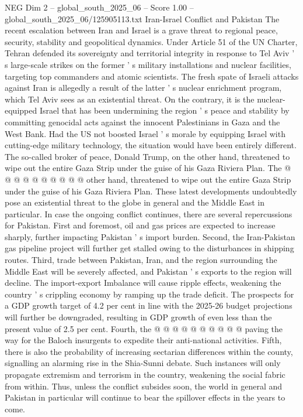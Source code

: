 \begin{textsample}{NEG Dim 2 – global\_south\_2025\_06 – Score 1.00 – global\_south\_2025\_06/125905113.txt}  \label{ex:f2_neg_367}
Iran-Israel Conflict and Pakistan The recent escalation between Iran and Israel is a grave threat to regional peace, security, stability and geopolitical dynamics.
Under Article 51 of the UN Charter, Tehran defended its sovereignty and territorial integrity in response to Tel Aviv ' s large-scale strikes on the former ' s military installations and nuclear facilities, targeting top commanders and atomic scientists.
The fresh spate of Israeli attacks against Iran is allegedly a result of the latter ' s nuclear enrichment program, which Tel Aviv sees as an existential threat.
On the contrary, it is the nuclear-equipped Israel that has been undermining the region ' s peace and stability by committing genocidal acts against the innocent Palestinians in Gaza and the West Bank.
Had the US not boosted Israel ' s morale by equipping Israel with cutting-edge military technology, the situation would have been entirely different.
The so-called broker of peace, Donald Trump, on the other hand, threatened to wipe out the entire Gaza Strip under the guise of his Gaza Riviera Plan.
The @ @ @ @ @ @ @ @ @ @ other hand, threatened to wipe out the entire Gaza Strip under the guise of his Gaza Riviera Plan.
These latest developments undoubtedly pose an existential threat to the globe in general and the Middle East in particular.
In case the ongoing conflict continues, there are several repercussions for Pakistan.
First and foremost, oil and gas prices are expected to increase sharply, further impacting Pakistan ' s import burden.
Second, the Iran-Pakistan gas pipeline project will further get stalled owing to the disturbances in shipping routes.
Third, trade between Pakistan, Iran, and the region surrounding the Middle East will be severely affected, and Pakistan ' s exports to the region will decline.
The import-export Imbalance will cause ripple effects, weakening the country ' s crippling economy by ramping up the trade deficit.
The prospects for a GDP growth target of 4.2 per cent in line with the 2025-26 budget projections will further be downgraded, resulting in GDP growth of even less than the present value of 2.5 per cent.
Fourth, the @ @ @ @ @ @ @ @ @ @ paving the way for the Baloch insurgents to expedite their anti-national activities.
Fifth, there is also the probability of increasing sectarian differences within the county, signalling an alarming rise in the Shia-Sunni debate.
Such instances will only propagate extremism and terrorism in the country, weakening the social fabric from within.
Thus, unless the conflict subsides soon, the world in general and Pakistan in particular will continue to bear the spillover effects in the years to come.

\end{textsample}
